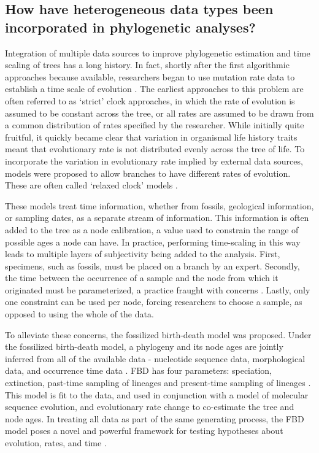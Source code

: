 \documentclass[]{article}
\begin{document}
\subsection*{How have heterogeneous data types been incorporated in phylogenetic analyses?}

Integration of multiple data sources to improve phylogenetic estimation and time scaling of trees has a long history. 
In fact, shortly after the first algorithmic approaches \cite{Farris1970} because available, researchers began to use mutation rate data to establish a time scale of evolution \cite{Zuckerkandl1962, Zuckerkandl1965}. The earliest approaches to this problem are often referred to as `strict' clock approaches, in which the rate of evolution is assumed to be constant across the tree, or all rates are assumed to be drawn from a common distribution of rates specified by the researcher.
While initially quite fruitful, it quickly became clear that variation in organismal life history traits meant that evolutionary rate is not distributed evenly across the tree of life.
To incorporate the variation in evolutionary rate implied by external data sources, models were proposed to allow branches to have different rates of evolution.
These are often called `relaxed clock' models \cite{zheng2001dispersion, Lepage2007}. \par
These models treat time information, whether from fossils, geological information, or sampling dates, as a separate stream of information.
This information is often added to the tree as a node calibration, a value used to constrain the range of possible ages a node can have. 
In practice, performing time-scaling in this way leads to multiple layers of subjectivity being added to the analysis.
First, specimens, such as fossils, must be placed on a branch by an expert.
Secondly, the time between the occurrence of a sample and the node from which it originated must be parameterized, a practice fraught with concerns \cite{Ho2006, heath2014}. 
Lastly, only one constraint can be used per node, forcing researchers to choose a sample, as opposed to using the whole of the data. \par
To alleviate these concerns, the fossilized birth-death model was proposed.
Under the fossilized birth-death model, a phylogeny and its node ages are jointly inferred from all of the available data - nucleotide sequence data, morphological data, and occurrence time data \cite{heath2014}. 
FBD has four parameters: speciation, extinction, past-time sampling of lineages and present-time sampling of lineages \cite{stadler2010}.
This model is fit to the data, and used in conjunction with a model of molecular sequence evolution, and evolutionary rate change to co-estimate the tree and node ages. 
In treating all data as part of the same generating process, the FBD model poses a novel and powerful framework for testing hypotheses about evolution, rates, and time \cite{Stadler2017}. \par
\end{document}
